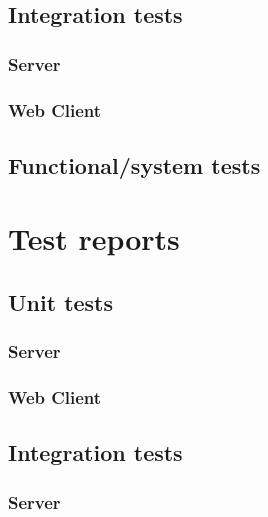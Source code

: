 \documentclass[a4paper,12pt]{article}
\begin{document}
        \subsection{Integration tests}
        
        	\subsubsection{Server}
        	
        	\subsubsection{Web Client}
        
        \subsection{Functional/system tests}
     
    \section{Test reports}
	   
    	\subsection{Unit tests}
	    
		    \subsubsection{Server}
		    
		    \subsubsection{Web Client}
	    
	    \subsection{Integration tests}
	    
		    \subsubsection{Server}
		    
\end{document}
